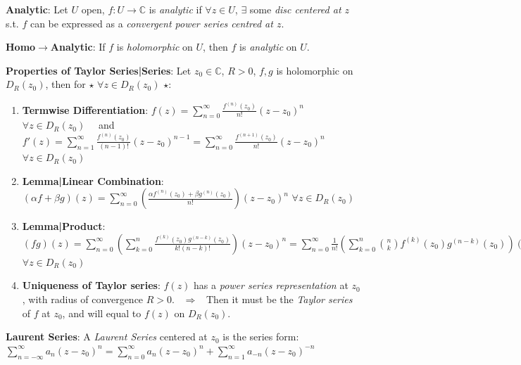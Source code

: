 \documentclass[9pt]{article}
\begin{document}
\textbf{Analytic}: {\small Let $U$ open, $f:U\to\mathbb{C}$ is \textit{analytic} if $\forall z\in U$, $\exists$ some \textit{disc centered at $z$} s.t. $f$ can be expressed as a \textit{convergent power series centred at $z$}.}

\quad \textbf{Homo$\rightarrow$Analytic}: If $f$ is \textit{holomorphic} on $U$, then $f$ is \textit{analytic} on $U$.

\textbf{Properties of Taylor Series|Series}: Let $z_0\in\mathbb{C}$, $R>0$, $f,g$ is holomorphic on $D_{R}(z_0)$, then for $\star$ $\forall z\in D_{R}(z_0)$ $\star$:

\begin{enumerate}[itemsep=-2pt, topsep=-2pt]
    \item \textbf{Termwise Differentiation}: {\small $f(z)=\sum\limits^\infty_{n=0}\frac{f^{(n)}(z_0)}{n!}(z-z_0)^n$ {\tiny $\forall z\in D_{R}(z_0)$} \ \ and \ \ $f'(z)=\sum\limits^\infty_{n=1}\frac{f^{(n)}(z_0)}{(n-1)!}(z-z_0)^{n-1}= \sum\limits^\infty_{n=0}\frac{f^{(n+1)}(z_0)}{n!}(z-z_0)^n$ {\tiny $\forall z\in D_{R}(z_0)$}}
    \vspace{-5pt}
    \item \textbf{Lemma|Linear Combination}: $(\alpha f+\beta g)(z)=\sum\limits^\infty_{n=0}\left(\frac{\alpha f^{(n)}(z_0)+\beta g^{(n)}(z_0)}{n!}\right)(z-z_0)^n$ {\tiny $\forall z\in D_{R}(z_0)$}
    \vspace{-5pt}
    \item \textbf{Lemma|Product}: $(fg)(z)=\sum\limits^\infty_{n=0}\left(\sum\limits^n_{k=0}\frac{f^{(k)}(z_0)g^{(n-k)}(z_0)}{k!(n-k)!}\right)(z-z_0)^n=\sum\limits^\infty_{n=0}\frac{1}{n!}\left(\sum\limits^n_{k=0}\binom{n}{k}f^{(k)}(z_0)g^{(n-k)}(z_0)\right)(z-z_0)^n$ {\tiny $\forall z\in D_{R}(z_0)$}
    \vspace{-1pt}
    \item \textbf{Uniqueness of Taylor series}: {\footnotesize $f(z)$ has a \textit{power series representation} at $z_0$, with radius of convergence $R>0$. \ $\Rightarrow$ \ Then it must be the \textit{Taylor series} of $f$ at $z_0$, and will equal to $f(z)$ on $D_{R}(z_0)$.} 
\end{enumerate}

\textbf{Laurent Series}: A \textit{Laurent Series} centered at $z_0$ is the series form: $\sum^\infty_{n=-\infty}a_n(z-z_0)^n=\sum^\infty_{n=0}a_n(z-z_0)^n+\sum^\infty_{n=1}a_{-n}(z-z_0)^{-n}$
\end{document}
